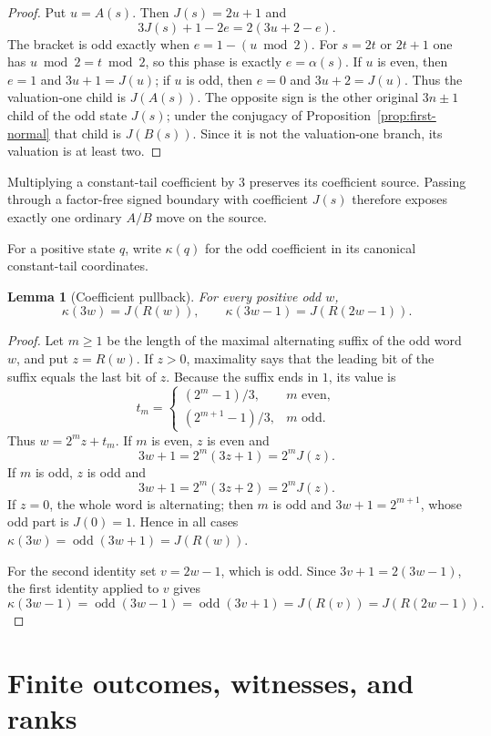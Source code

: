 \documentclass[11pt]{article}
\newtheorem{lemma}[theorem]{Lemma}
\newcommand{\odd}{\operatorname{odd}}
\begin{document}
\begin{proof}
Put $u=A(s)$. Then $J(s)=2u+1$ and
\[
  3J(s)+1-2e=2(3u+2-e).
\]
The bracket is odd exactly when $e=1-(u\bmod2)$. For $s=2t$ or $2t+1$ one
has $u\bmod2=t\bmod2$, so this phase is exactly $e=\alpha(s)$. If $u$ is
even, then $e=1$ and $3u+1=J(u)$; if $u$ is odd, then $e=0$ and
$3u+2=J(u)$. Thus the valuation-one child is $J(A(s))$. The opposite sign is
the other original $3n\pm1$ child of the odd state $J(s)$; under the
conjugacy of Proposition~\ref{prop:first-normal} that child is $J(B(s))$.
Since it is not the valuation-one branch, its valuation is at least two.
\end{proof}

Multiplying a constant-tail coefficient by $3$ preserves its coefficient
source. Passing through a factor-free signed boundary with coefficient $J(s)$
therefore exposes exactly one ordinary $A/B$ move on the source.

For a positive state $q$, write $\kappa(q)$ for the odd coefficient in its
canonical constant-tail coordinates.

\begin{lemma}[Coefficient pullback]\label{lem:coeff-pullback}
For every positive odd $w$,
\[
  \kappa(3w)=J(R(w)),\qquad
  \kappa(3w-1)=J(R(2w-1)).
\]
\end{lemma}

\begin{proof}
Let $m\ge1$ be the length of the maximal alternating suffix of the odd word
$w$, and put $z=R(w)$. If $z>0$, maximality says that the leading bit of the
suffix equals the last bit of $z$. Because the suffix ends in $1$, its value is
\[
 t_m=\begin{cases}
 (2^m-1)/3,&m\text{ even},\\
 (2^{m+1}-1)/3,&m\text{ odd}.
 \end{cases}
\]
Thus $w=2^mz+t_m$. If $m$ is even, $z$ is even and
\[
  3w+1=2^m(3z+1)=2^mJ(z).
\]
If $m$ is odd, $z$ is odd and
\[
  3w+1=2^m(3z+2)=2^mJ(z).
\]
If $z=0$, the whole word is alternating; then $m$ is odd and
$3w+1=2^{m+1}$, whose odd part is $J(0)=1$. Hence in all cases
$\kappa(3w)=\odd(3w+1)=J(R(w))$.

For the second identity set $v=2w-1$, which is odd. Since
$3v+1=2(3w-1)$, the first identity applied to $v$ gives
\[
 \kappa(3w-1)=\odd(3w-1)=\odd(3v+1)=J(R(v))=J(R(2w-1)).
\]
\end{proof}


\section{Finite outcomes, witnesses, and ranks}
\end{document}
